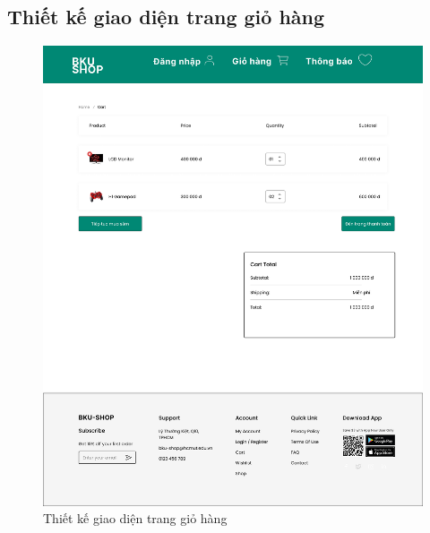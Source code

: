 \subsection {Thiết kế giao diện trang giỏ hàng}
\begin{figure}[H]
    \begin{center}
    \includegraphics[scale=0.2]{images/hieu/chap-4/cart.jpg}
    \vspace*{5mm}
    \caption{Thiết kế giao diện trang giỏ hàng}
    \end{center}
\end{figure}
